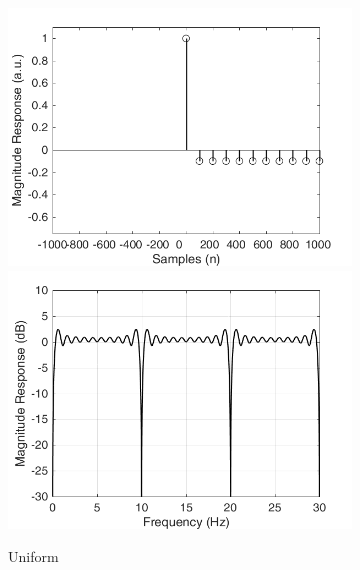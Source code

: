 \documentclass[a4paper]{article}
\begin{document}
\begin{figure}[hbtp]
    \begin{subfigure}{.245\textwidth}
        \includegraphics[width=\textwidth]{img/causal/kernel_ave.png}\\
        \includegraphics[width=\textwidth]{img/causal/mag_ave.png}
        \caption{Uniform}\label{fig:UniformKernel}
    \end{subfigure}
    \begin{subfigure}{.245\textwidth}

\end{subfigure}
\end{figure}
\end{document}
